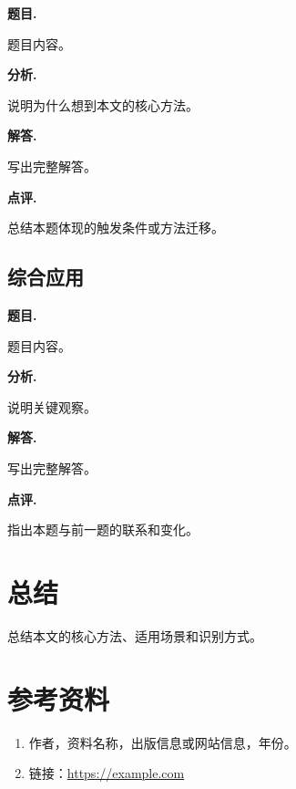 \documentclass[10pt,a4paper,fontset=fandol]{ctexart}
\begin{document}
\textbf{题目.}

题目内容。

\textbf{分析.}

说明为什么想到本文的核心方法。

\textbf{解答.}

写出完整解答。

\textbf{点评.}

总结本题体现的触发条件或方法迁移。

\subsection{综合应用}

\textbf{题目.}

题目内容。

\textbf{分析.}

说明关键观察。

\textbf{解答.}

写出完整解答。

\textbf{点评.}

指出本题与前一题的联系和变化。

\section{总结}

总结本文的核心方法、适用场景和识别方式。

\section*{参考资料}

\begin{enumerate}
  \item 作者，资料名称，出版信息或网站信息，年份。
  \item 链接：\url{https://example.com}
\end{enumerate}
\end{document}
